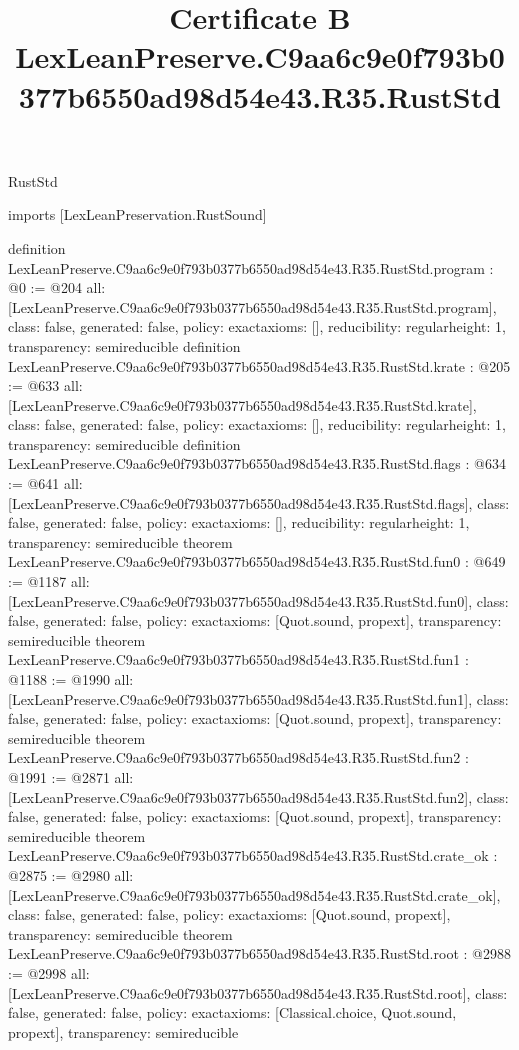 \begin{lexlean}{RustStd}
\title{Certificate B LexLeanPreserve.C9aa6c9e0f793b0377b6550ad98d54e43.R35.RustStd}
\begin{coremodule}
imports [LexLeanPreservation.RustSound]

definition LexLeanPreserve.C9aa6c9e0f793b0377b6550ad98d54e43.R35.RustStd.program : @0 := @204 {
  all: [LexLeanPreserve.C9aa6c9e0f793b0377b6550ad98d54e43.R35.RustStd.program],
  class: false,
  generated: false,
  policy: exact{axioms: []},
  reducibility: regular{height: 1},
  transparency: semireducible
}
definition LexLeanPreserve.C9aa6c9e0f793b0377b6550ad98d54e43.R35.RustStd.krate : @205 := @633 {
  all: [LexLeanPreserve.C9aa6c9e0f793b0377b6550ad98d54e43.R35.RustStd.krate],
  class: false,
  generated: false,
  policy: exact{axioms: []},
  reducibility: regular{height: 1},
  transparency: semireducible
}
definition LexLeanPreserve.C9aa6c9e0f793b0377b6550ad98d54e43.R35.RustStd.flags : @634 := @641 {
  all: [LexLeanPreserve.C9aa6c9e0f793b0377b6550ad98d54e43.R35.RustStd.flags],
  class: false,
  generated: false,
  policy: exact{axioms: []},
  reducibility: regular{height: 1},
  transparency: semireducible
}
theorem LexLeanPreserve.C9aa6c9e0f793b0377b6550ad98d54e43.R35.RustStd.fun0 : @649 := @1187 {
  all: [LexLeanPreserve.C9aa6c9e0f793b0377b6550ad98d54e43.R35.RustStd.fun0],
  class: false,
  generated: false,
  policy: exact{axioms: [Quot.sound, propext]},
  transparency: semireducible
}
theorem LexLeanPreserve.C9aa6c9e0f793b0377b6550ad98d54e43.R35.RustStd.fun1 : @1188 := @1990 {
  all: [LexLeanPreserve.C9aa6c9e0f793b0377b6550ad98d54e43.R35.RustStd.fun1],
  class: false,
  generated: false,
  policy: exact{axioms: [Quot.sound, propext]},
  transparency: semireducible
}
theorem LexLeanPreserve.C9aa6c9e0f793b0377b6550ad98d54e43.R35.RustStd.fun2 : @1991 := @2871 {
  all: [LexLeanPreserve.C9aa6c9e0f793b0377b6550ad98d54e43.R35.RustStd.fun2],
  class: false,
  generated: false,
  policy: exact{axioms: [Quot.sound, propext]},
  transparency: semireducible
}
theorem LexLeanPreserve.C9aa6c9e0f793b0377b6550ad98d54e43.R35.RustStd.crate_ok : @2875 := @2980 {
  all: [LexLeanPreserve.C9aa6c9e0f793b0377b6550ad98d54e43.R35.RustStd.crate_ok],
  class: false,
  generated: false,
  policy: exact{axioms: [Quot.sound, propext]},
  transparency: semireducible
}
theorem LexLeanPreserve.C9aa6c9e0f793b0377b6550ad98d54e43.R35.RustStd.root : @2988 := @2998 {
  all: [LexLeanPreserve.C9aa6c9e0f793b0377b6550ad98d54e43.R35.RustStd.root],
  class: false,
  generated: false,
  policy: exact{axioms: [Classical.choice, Quot.sound, propext]},
  transparency: semireducible
}


\end{coremodule}
\end{lexlean}
